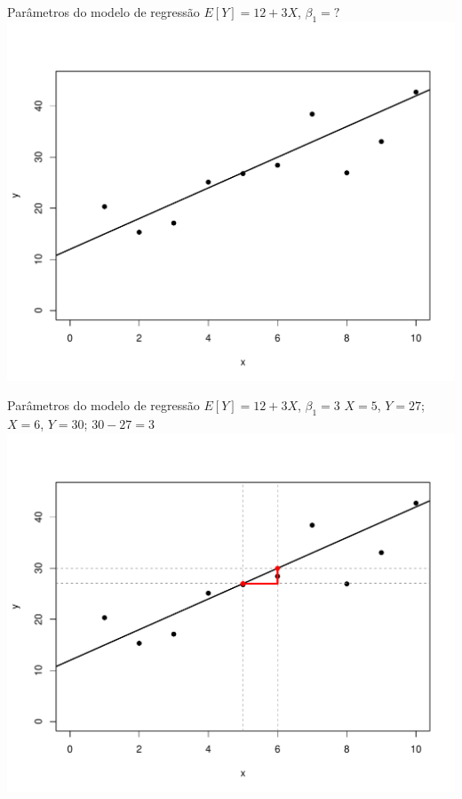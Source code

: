 \documentclass{beamer}\usepackage[]{graphicx}\usepackage[]{color}
\newenvironment{knitrout}{}{} %
\renewenvironment{knitrout}{\setlength{\topsep}{0mm}}{}
\begin{document}
\begin{frame}{Parâmetros do modelo de regressão}
\centering
$E[Y] = 12 + 3X$, $\beta _1 = ?$
\vfill
\begin{knitrout}
\color{fgcolor}
\includegraphics[width=0.7\linewidth]{figure/param4-1} 

\end{knitrout}


\end{frame}


\begin{frame}{Parâmetros do modelo de regressão}
\centering
$E[Y] = 12 + 3X$, \alert{$\beta _1 = 3$}
\vfill
$X=5$, $Y=27$; $X=6$, $Y=30$; $30 - 27 = 3$
\vfill
\begin{knitrout}
\color{fgcolor}
\includegraphics[width=0.7\linewidth]{figure/param5-1} 

\end{knitrout}


\end{frame}
\end{document}
